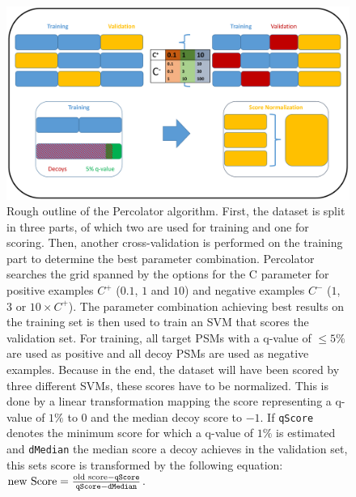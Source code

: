 \begin{figure}
	\normalsize
	\centering
	\includegraphics[width = \textwidth]{figures/Percolator_diagram.pdf}
	\caption[Procedure of Percolator]{Rough outline of the Percolator algorithm. First, the dataset is split in three parts, of which two are used for training and one for scoring. Then, another cross-validation is performed on the training part to determine the best parameter combination. Percolator searches the grid spanned by the options for the C parameter for positive examples $C^{+}$ ($0.1$, $1$ and $10$) and negative examples $C^{-}$ ($1$, $3$ or $10 \times C^{+}$). The parameter combination achieving best results on the training set is then used to train an SVM that scores the validation set. For training, all target PSMs with a q-value of $\leq 5\%$ are used as positive and all decoy PSMs are used as negative examples. Because in the end, the dataset will have been scored by three different SVMs, these scores have to be normalized. This is done by a linear transformation mapping the score representing a q-value of $1\%$ to $0$ and the median decoy score to $-1$. If \texttt{qScore} denotes the minimum score for which a q-value of $1\%$ is estimated and \texttt{dMedian} the median score a decoy achieves in the validation set, this sets score is transformed by the following equation: $\text{new Score} = \frac{\text{old score} - \text{\texttt{qScore}}}{\text{\texttt{qScore}} - \text{\texttt{dMedian}}}$.}
	\label{fig:percolator}
\end{figure}
\renewcommand{\baselinestretch}{1}\\

